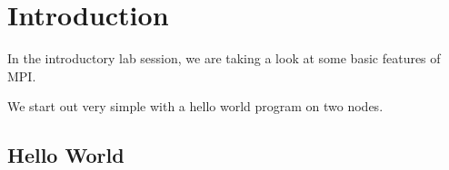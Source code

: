 \section{Introduction}
In the introductory lab session, we are taking a look at some basic features of MPI. 

We start out very simple with a hello world program on two nodes. 

\subsection{Hello World}
